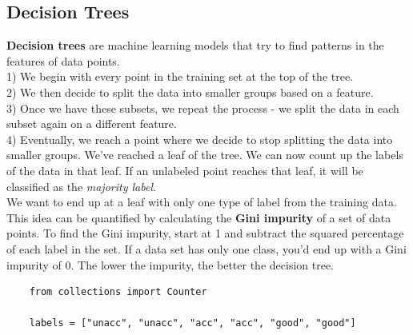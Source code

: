 \documentclass[11pt, a4paper]{article}
\begin{document}
\begin{spacing}{1.1}
	\subsection{Decision Trees}
	\textbf{Decision trees} are machine learning models that try to find patterns in the features of data points. \vspace*{1mm} \\ 
	1) We begin with every point in the training set at the top of the tree. \\
	2) We then decide to split the data into smaller groups based on a feature. \\
	3) Once we have these subsets, we repeat the process - we split the data in each subset again on a \hspace*{4mm} different feature. \\
	4) Eventually, we reach a point where we decide to stop splitting the data into smaller groups. We’ve \hspace*{4mm} reached a leaf of the tree. We can now count up the labels of the data in that leaf. If an unlabeled \hspace*{4mm} point reaches that leaf, it will be classified as the \textit{majority label}. \vspace*{2mm} \\
	We want to end up at a leaf with only one type of label from the training data.	This idea can be quantified by calculating the \textbf{Gini impurity} of a set of data points. To find the Gini impurity, start at 1 and subtract the squared percentage of each label in the set. If a data set has only one class, you’d end up with a Gini impurity of 0. The lower the impurity, the better the decision tree.
	\begin{lstlisting}
	from collections import Counter
	
	labels = ["unacc", "unacc", "acc", "acc", "good", "good"]
	

\end{lstlisting}
\end{spacing}
\end{document}
